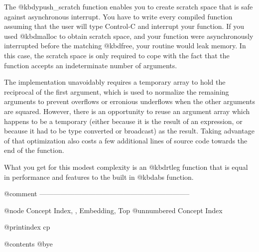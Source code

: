 The @kbd{ypush_scratch} function enables you to create scratch space
that is safe against asynchronous interrupt.  You have to write every
compiled function assuming that the user will type Control-C and
interrupt your function.  If you used @kbd{malloc} to obtain scratch
space, and your function were asynchronously interrupted before the
matching @kbd{free}, your routine would leak memory.  In this case,
the scratch space is only required to cope with the fact that the
function accepts an indeterminate number of arguments.

The implementation unavoidably requires a temporary array to hold the
reciprocal of the first argument, which is used to normalize the
remaining arguments to prevent overflows or erronious underflows when
the other arguments are squared.  However, there is an opportunity to
reuse an argument array which happens to be a temporary (either
because it is the result of an expression, or because it had to be
type converted or broadcast) as the result.  Taking advantage of that
optimization also costs a few additional lines of source code towards
the end of the function.

What you get for this modest complexity is an @kbd{rtleg} function
that is equal in performance and features to the built in @kbd{abs}
function.

@comment -----------------------------------------------------------------

@node    Concept Index,  , Embedding, Top
@unnumbered Concept Index

@printindex cp

@contents
@bye
